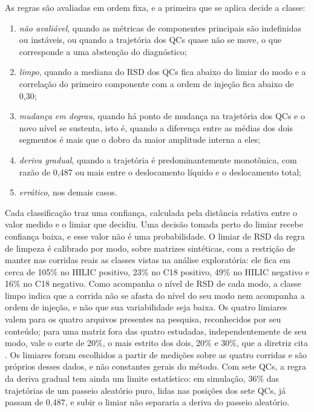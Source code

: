As regras são avaliadas em ordem fixa, e a primeira que se aplica decide a classe:

\begin{enumerate}
\item
  \emph{não avaliável}, quando as métricas de componentes principais são indefinidas ou instáveis, ou quando a trajetória dos QCs quase não se move, o que corresponde a uma abstenção do diagnóstico;
\item
  \emph{limpo}, quando a mediana do RSD dos QCs fica abaixo do limiar do modo e a correlação do primeiro componente com a ordem de injeção fica abaixo de 0,30;
\item
  \emph{mudança em degrau}, quando há ponto de mudança na trajetória dos QCs e o novo nível se sustenta, isto é, quando a diferença entre as médias dos dois segmentos é mais que o dobro da maior amplitude interna a eles;
\item
  \emph{deriva gradual}, quando a trajetória é predominantemente monotônica, com razão de 0,487 ou mais entre o deslocamento líquido e o deslocamento total;
\item
  \emph{errático}, nos demais casos.
\end{enumerate}

Cada classificação traz uma confiança, calculada pela distância relativa entre o valor medido e o limiar que decidiu. Uma decisão tomada perto do limiar recebe confiança baixa, e esse valor não é uma probabilidade. O limiar de RSD da regra de limpeza é calibrado por modo, sobre matrizes sintéticas, com a restrição de manter nas corridas reais as classes vistas na análise exploratória: ele fica em cerca de 105\% no HILIC positivo, 23\% no C18 positivo, 49\% no HILIC negativo e 16\% no C18 negativo. Como acompanha o nível de RSD de cada modo, a classe limpo indica que a corrida não se afasta do nível do seu modo nem acompanha a ordem de injeção, e não que sua variabilidade seja baixa. Os quatro limiares valem para os quatro arquivos presentes na pesquisa, reconhecidos por seu conteúdo; para uma matriz fora das quatro estudadas, independentemente de seu modo, vale o corte de 20\%, o mais estrito dos dois, 20\% e 30\%, que a diretriz cita \cite{broadhurst2018guidelines}. Os limiares foram escolhidos a partir de medições sobre as quatro corridas e são próprios desses dados, e não constantes gerais do método. Com sete QCs, a regra da deriva gradual tem ainda um limite estatístico: em simulação, 36\% das trajetórias de um passeio aleatório puro, lidas nas posições dos sete QCs, já passam de 0,487, e subir o limiar não separaria a deriva do passeio aleatório.

